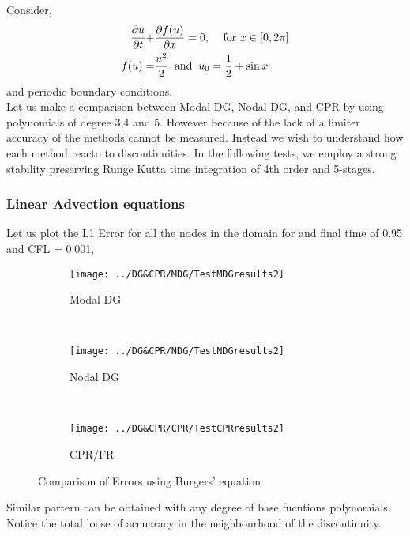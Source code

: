 \begin{frame}
	Consider,
	\begin{align}
		\frac{\partial u}{\partial t} +& \frac{\partial f(u)}{\partial x} = 0, \;\;\; \text{ for } x\in[0,2\pi] \\
		f(u) =& \frac{u^2}{2} \;\; \text{and} \;\; u_0 = \frac{1}{2} + \sin x
	\end{align}
	and periodic boundary conditions. \\
	Let us make a comparison between Modal DG, Nodal DG, and CPR by using polynomials of degree 3,4 and 5. However because of the lack of a limiter accuracy of the methods cannot be measured. Instead we wish to understand how each method reacto to discontinuities. 
	In the following tests, we employ a strong stability preserving Runge Kutta time integration of 4th order and 5-stages.
\end{frame}

\begin{frame} \frametitle{Linear Advection equations}
Let us plot the L1 Error for all the nodes in the domain for and final time of 0.95 and CFL = 0.001,
	\begin{figure}
        \centering
        \begin{subfigure}[b]{0.31\textwidth}
                \centering
                \texttt{[image: ../DG\&CPR/MDG/TestMDGresults2]}
                \caption{Modal DG}
                \label{fig:TestMDGresults2}
        \end{subfigure}%
				~
        \begin{subfigure}[b]{0.31\textwidth}
                \centering
                \texttt{[image: ../DG\&CPR/NDG/TestNDGresults2]}
                \caption{Nodal DG}
                \label{fig:TestNDGresults2}
        \end{subfigure}
				~
        \begin{subfigure}[b]{0.31\textwidth}
								\centering
                \texttt{[image: ../DG\&CPR/CPR/TestCPRresults2]}
                \caption{CPR/FR}
                \label{fig:TestCPRresults2}
        \end{subfigure}
				\caption{Comparison of Errors using Burgers' equation}
				\label{fig:compareLinearAdvection_p3p4p5}
	\end{figure}
	Similar partern can be obtained with any degree of base fucntions polynomials. Notice the total loose of accuaracy in the neighbourhood of the discontinuity.
\end{frame}

